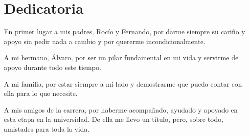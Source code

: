\documentclass[12pt]{report} %
\begin{document}
\begin{abstract}
	None of the tests for mean differences in allocated capital remains significant after correction, indicating no sustained preference for any condition. The evidence instead appears in the dispersion: in twelve combinations of committee composition, role level, and attribute, the variability of the differences across repeated runs substantially exceeds that of the internal reference. This effect is concentrated in single-model committees, does not appear in any mixed-model committee, reaches its maximum before any exchange of information between agents, and diminishes during deliberation. An intervention based on neutralization instructions consistently reduces variability in the geographical variants, although the supporting evidence is limited.
	
	These results show that bias can manifest as instability rather than as a systematic shift, making it invisible to audits based solely on mean differences. Detecting this form of bias requires repeated runs and empirical references for the system's inherent variability. Furthermore, how the models are combined within the system is as important to its behavior as the individual models themselves.
	
	\textbf{Keywords:}
	natural language processing; algorithmic fairness; counterfactual analysis; decision-making; multi-agent systems.

	
	\vfill
\end{abstract}
\newpage %
\thispagestyle{empty}
\mbox{}


\chapter*{Dedicatoria}

\setcounter{page}{5}
	
		En primer lugar a mis padres, Rocío y Fernando, por darme siempre su cariño y apoyo sin pedir nada a cambio y por quererme incondicionalmente.
		
		A mi hermano, Álvaro, por ser un pilar fundamental en mi vida y servirme de apoyo durante todo este tiempo.
		
		A mi familia, por estar siempre a mi lado y demostrarme que puedo contar con ella para lo que necesite.

		
		A mis amigos de la carrera, por haberme acompañado, ayudado y apoyado en esta etapa en la universidad. De ella me llevo un título, pero, sobre todo, amistades para toda la vida.
		
\end{document}
